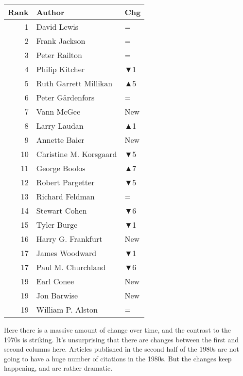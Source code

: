 \documentclass[
  10pt,
  letterpaper,
  DIV=11,
  numbers=noendperiod,
  twoside]{scrartcl}
\begin{document}
\begin{table}
\begin{minipage}{0.20\linewidth}
{\begin{tabular}{rll}
\toprule
Rank & Author & Chg\\
\midrule
1 & David Lewis & =\\
2 & Frank Jackson & =\\
3 & Peter Railton & =\\
4 & Philip Kitcher & \textcolor[RGB]{178,34,34}{▼1}\\
5 & Ruth Garrett Millikan & \textcolor[RGB]{34,178,34}{▲5}\\
6 & Peter Gärdenfors & =\\
7 & Vann McGee & \textcolor[RGB]{34,178,34}{New}\\
8 & Larry Laudan & \textcolor[RGB]{34,178,34}{▲1}\\
9 & Annette Baier & \textcolor[RGB]{34,178,34}{New}\\
10 & Christine M. Korsgaard & \textcolor[RGB]{178,34,34}{▼5}\\
11 & George Boolos & \textcolor[RGB]{34,178,34}{▲7}\\
12 & Robert Pargetter & \textcolor[RGB]{178,34,34}{▼5}\\
13 & Richard Feldman & =\\
14 & Stewart Cohen & \textcolor[RGB]{178,34,34}{▼6}\\
15 & Tyler Burge & \textcolor[RGB]{178,34,34}{▼1}\\
16 & Harry G. Frankfurt & \textcolor[RGB]{34,178,34}{New}\\
17 & James Woodward & \textcolor[RGB]{178,34,34}{▼1}\\
17 & Paul M. Churchland & \textcolor[RGB]{178,34,34}{▼6}\\
19 & Earl Conee & \textcolor[RGB]{34,178,34}{New}\\
19 & Jon Barwise & \textcolor[RGB]{34,178,34}{New}\\
19 & William P. Alston & =\\
\bottomrule
\end{tabular}

}

\end{minipage}%

\end{table}%

Here there is a massive amount of change over time, and the contrast to
the 1970s is striking. It's unsurprising that there are changes between
the first and second columns here. Articles published in the second half
of the 1980s are not going to have a huge number of citations in the
1980s. But the changes keep happening, and are rather dramatic.
\end{document}
